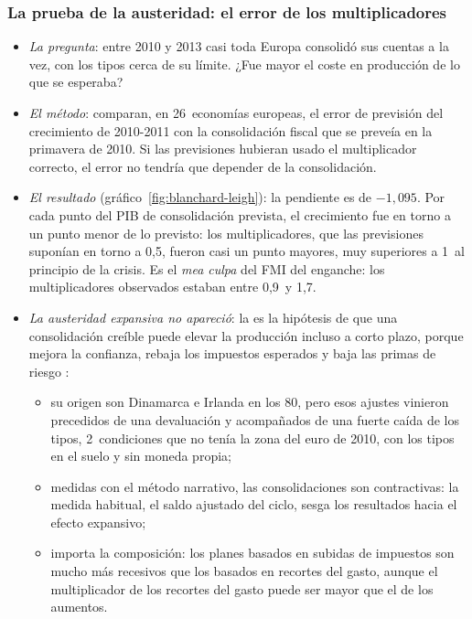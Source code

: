 \documentclass[11pt]{article}
\begin{document}
\subsubsection{La prueba de la austeridad: el error de los multiplicadores}\label{sec:blanchard-leigh}

\begin{itemize}
\item \emph{La pregunta}: entre 2010 y 2013 casi toda Europa consolidó sus cuentas a la vez, con los tipos cerca de su límite. ¿Fue mayor el coste en producción de lo que se esperaba?
\item \emph{El método}\nocite{BlanchardLeigh2013Growth}: comparan, en 26~economías europeas, el error de previsión del crecimiento de 2010-2011 con la consolidación fiscal que se preveía en la primavera de 2010. Si las previsiones hubieran usado el multiplicador correcto, el error no tendría que depender de la consolidación.
\item \emph{El resultado} (gráfico~\ref{fig:blanchard-leigh}): la pendiente es de $-1{,}095$. Por cada punto del PIB de consolidación prevista, el crecimiento fue en torno a un punto menor de lo previsto: los multiplicadores, que las previsiones suponían en torno a 0,5, fueron casi un punto mayores, muy superiores a 1~al principio de la crisis. Es el \emph{mea culpa} del FMI del enganche: los multiplicadores observados estaban entre 0,9~y 1,7\nocite{FMI2012WEOoct}.
\item \emph{La austeridad expansiva no apareció}: la  es la hipótesis de que una consolidación creíble puede elevar la producción incluso a corto plazo, porque mejora la confianza, rebaja los impuestos esperados y baja las primas de riesgo :
  \begin{itemize}
  \item su origen son Dinamarca e Irlanda en los 80, pero esos ajustes vinieron precedidos de una devaluación y acompañados de una fuerte caída de los tipos\nocite{GiavazziPagano1990Can}, 2~condiciones que no tenía la zona del euro de 2010, con los tipos en el suelo y sin moneda propia;
  \item medidas con el método narrativo, las consolidaciones son contractivas: la medida habitual, el saldo ajustado del ciclo, sesga los resultados hacia el efecto expansivo\nocite{GuajardoLeighPescatori2014};
  \item importa la composición: los planes basados en subidas de impuestos son mucho más recesivos que los basados en recortes del gasto\nocite{AlesinaFaveroGiavazzi2019Austerity}, aunque el multiplicador de los recortes del gasto puede ser mayor que el de los aumentos\nocite{BarnichonDebortoliMatthes2022}.

\end{itemize}
\end{itemize}
\end{document}
